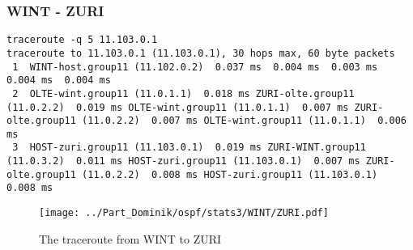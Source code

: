 \subsubsection{WINT - ZURI}
\begin{lstlisting}
traceroute -q 5 11.103.0.1
traceroute to 11.103.0.1 (11.103.0.1), 30 hops max, 60 byte packets
 1  WINT-host.group11 (11.102.0.2)  0.037 ms  0.004 ms  0.003 ms  0.004 ms  0.004 ms
 2  OLTE-wint.group11 (11.0.1.1)  0.018 ms ZURI-olte.group11 (11.0.2.2)  0.019 ms OLTE-wint.group11 (11.0.1.1)  0.007 ms ZURI-olte.group11 (11.0.2.2)  0.007 ms OLTE-wint.group11 (11.0.1.1)  0.006 ms
 3  HOST-zuri.group11 (11.103.0.1)  0.019 ms ZURI-WINT.group11 (11.0.3.2)  0.011 ms HOST-zuri.group11 (11.103.0.1)  0.007 ms ZURI-olte.group11 (11.0.2.2)  0.008 ms HOST-zuri.group11 (11.103.0.1)  0.008 ms
\end{lstlisting}
\begin{figure}[H]
\centering
\texttt{[image: ../Part\_Dominik/ospf/stats3/WINT/ZURI.pdf]}
\caption{The traceroute from WINT to ZURI}
\end{figure}
